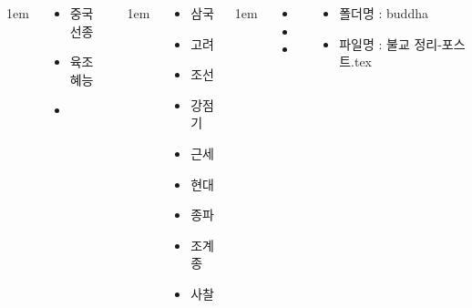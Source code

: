 \documentclass[20pt, a0paper, landscape]{tikzposter}
\begin{document}
\begin{columns}
			{
					\setlength{\leftmargini}{3em}
					\setlength{\labelsep} {1em}
				\begin{LARGE}
					\begin{itemize}
					\item 중국 선종
					\item 육조 혜능 
					\item 
					\end{itemize}
				\end{LARGE}
			} %


			{
					\setlength{\leftmargini}{3em}
					\setlength{\labelsep} {1em}
				\begin{LARGE}
					\begin{itemize}
					\item 삼국
					\item 고려
					\item 조선
					\item 강점기
					\item 근세
					\item 현대

					\item 종파
					\item 조계종

					\item 사찰


					\end{itemize}
				\end{LARGE}
			} %


			{
					\setlength{\leftmargini}{3em}
					\setlength{\labelsep} {1em}
				\begin{LARGE}
					\begin{itemize}
					\item 
					\item 
					\item 
					\end{itemize}
				\end{LARGE}
			} %

			{
				\begin{LARGE}
					\begin{itemize}
					\item 폴더명 : buddha
					\item 파일명 : 불교 정리-포스트.tex
					\end{itemize}
				\end{LARGE}
			}





	\end{columns}
\end{document}
